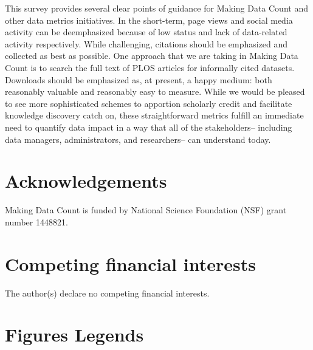 \documentclass[english]{article}
\begin{document}
This survey provides several clear points of guidance for Making Data Count and other data metrics initiatives.
In the short-term, page views and social media activity can be deemphasized because of low status and lack of data-related activity respectively.
While challenging, citations should be emphasized and collected as best as possible.
One approach that we are taking in Making Data Count is to search the full text of PLOS articles for informally cited datasets.
Downloads should be emphasized as, at present, a happy medium: both reasonably valuable and reasonably easy to measure.
While we would be pleased to see more sophisticated schemes to apportion scholarly credit and facilitate knowledge discovery \cite{ingwersen_indicators_2011, ding_enititymetrics_2013, katz_transitive_2014} catch on, these straightforward metrics fulfill an immediate need to quantify data impact in a way that all of the stakeholders-- including data managers, administrators, and researchers-- can understand today.


\section*{Acknowledgements}

Making Data Count is funded by National Science Foundation (NSF) grant number 1448821.


\section*{Competing financial interests}


The author(s) declare no competing financial interests.


\section*{Figures Legends}

\end{document}
